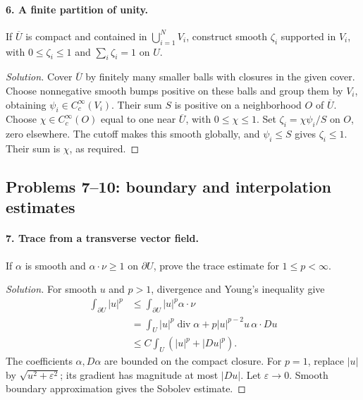 \paragraph{6. A finite partition of unity.}
If $\overline U$ is compact and contained in $\bigcup_{i=1}^NV_i$,
construct smooth $\zeta_i$ supported in $V_i$, with $0\leq\zeta_i\leq1$
and $\sum_i\zeta_i=1$ on $U$.
\begin{proof}[Solution]
Cover $\overline U$ by finitely many smaller balls with closures in the
given cover. Choose nonnegative smooth bumps positive on these balls
and group them by $V_i$, obtaining $\psi_i\in C_c^\infty(V_i)$.
Their sum $S$ is positive on a neighborhood $O$ of $\overline U$.
Choose $\chi\in C_c^\infty(O)$ equal to one near $\overline U$,
with $0\leq\chi\leq1$. Set $\zeta_i=\chi\psi_i/S$ on $O$, zero
elsewhere. The cutoff makes this smooth globally, and $\psi_i\leq S$
gives $\zeta_i\leq1$. Their sum is $\chi$, as required.
\end{proof}
\Needspace{45mm}

\subsection{Problems 7--10: boundary and interpolation estimates}
\paragraph{7. Trace from a transverse vector field.}
If $\alpha$ is smooth and $\alpha\cdot\nu\geq1$ on $\partial U$, prove
the trace estimate for $1\leq p<\infty$.
\begin{proof}[Solution]
For smooth $u$ and $p>1$, divergence and Young's inequality give
\[
 \begin{split}
 \int_{\partial U}|u|^p
 &\leq\int_{\partial U}|u|^p\alpha\cdot\nu\\
 &=\int_U|u|^p\operatorname{div}\alpha
       +p|u|^{p-2}u\,\alpha\cdot Du\\
 &\leq C\int_U(|u|^p+|Du|^p).
 \end{split}
\]
The coefficients $\alpha,D\alpha$ are bounded on the compact closure.
For $p=1$, replace $|u|$ by $\sqrt{u^2+\varepsilon^2}$; its gradient
has magnitude at most $|Du|$. Let $\varepsilon\to0$.
Smooth boundary approximation gives the Sobolev estimate.
\end{proof}

